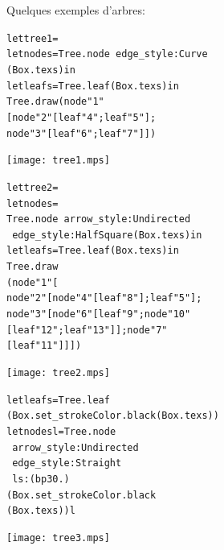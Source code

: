 \documentclass[a4paper,12pt]{article}
\begin{document}
Quelques exemples d'arbres:

\bigskip

\begin{minipage}{0.5\linewidth}
  \begin{alltt}
    let tree1 =
    let node s = Tree.node ~edge_style:Curve 
    (Box.tex s) in
    let leaf s = Tree.leaf (Box.tex s) in
    Tree.draw (node "1" 
    [node "2" [leaf "4"; leaf "5"]; 
      node "3" [leaf "6"; leaf "7"]])
  \end{alltt}
\end{minipage}
\begin{minipage}{0.5\linewidth}
  \begin{center}
    \texttt{[image: tree1.mps]}
  \end{center}
\end{minipage}

\bigskip

\begin{minipage}{0.5\linewidth}
  \begin{alltt}
    let tree2 =
    let node s = 
    Tree.node ~arrow_style:Undirected 
    ~edge_style:HalfSquare (Box.tex s) in
    let leaf s = Tree.leaf (Box.tex s) in
    Tree.draw 
    (node "1" [
      node "2" [node "4" [leaf "8"]; leaf "5"]; 
      node "3" [node "6" [leaf "9"; node "10" 
          [leaf "12"; leaf "13"]];node "7" 
        [leaf "11"]]])
  \end{alltt}
\end{minipage}
\begin{minipage}{0.5\linewidth}
  \begin{center}
    \texttt{[image: tree2.mps]}
  \end{center}
\end{minipage}

\bigskip

\begin{minipage}{0.5\linewidth}
  \begin{alltt}
    let leaf s = Tree.leaf 
    (Box.set_stroke Color.black (Box.tex s))
    let node s l = Tree.node  
    ~arrow_style:Undirected 
    ~edge_style:Straight 
    ~ls:(bp 30.)
    (Box.set_stroke Color.black 
    (Box.tex s)) l
  \end{alltt}
\end{minipage}
\begin{minipage}{0.5\linewidth}
  \begin{center}
    \texttt{[image: tree3.mps]}
  \end{center}
\end{minipage}
\end{document}
